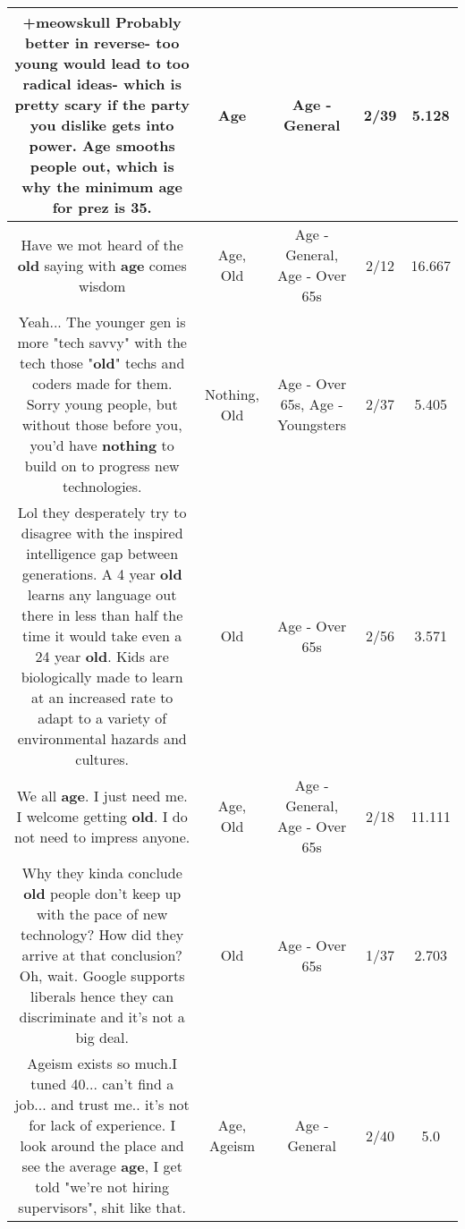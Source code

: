 \documentclass[11pt]{article}
\newlength\mylength
\begin{document}
\begin{center}
\begin{longtable}{|C{.65\mylength}|C{.30\mylength}|C{.12\mylength}|C{.12\mylength}|C{.12\mylength}|}
  \small +meowskull Probably better in reverse- too young would lead to too radical ideas- which is pretty scary if the party you dislike gets into power. \textbf{Age} smooths people out, which is why the minimum \textbf{age} for prez is 35.\normalsize   & Age & Age - General & 2/39 & 5.128 \\  \hline
  \small Have we mot heard of the \textbf{old} saying with \textbf{age} comes wisdom\normalsize   & Age, Old & Age - General, Age - Over 65s & 2/12 & 16.667 \\  \hline
  \small Yeah... The younger gen is more "tech savvy" with the tech those "\textbf{old}" techs and coders made for them. Sorry young people, but without those before you, you'd have \textbf{nothing} to build on to progress new technologies.\normalsize   & Nothing, Old & Age - Over 65s, Age - Youngsters & 2/37 & 5.405 \\  \hline
  \small Lol they desperately try to disagree with the inspired intelligence gap between generations. A 4 year \textbf{old} learns any language out there in less than half the time it would take even a 24 year \textbf{old}. Kids are biologically made to learn at an increased rate to adapt to a variety of environmental hazards and cultures.\normalsize   & Old & Age - Over 65s & 2/56 & 3.571 \\  \hline
  \small We all \textbf{age}. I just need me. I welcome getting \textbf{old}. I do not need to impress anyone.\normalsize   & Age, Old & Age - General, Age - Over 65s & 2/18 & 11.111 \\  \hline
  \small Why they kinda conclude \textbf{old} people don't keep up with the pace of new technology? How did they arrive at that conclusion? Oh, wait. Google supports liberals hence they can discriminate and it's not a big deal.\normalsize   & Old & Age - Over 65s & 1/37 & 2.703 \\  \hline
  \small Ageism exists so much.I tuned 40... can't find a job... and trust me.. it's not for lack of experience. I look around the place and see the average \textbf{age}, I get told "we're not hiring supervisors", shit like that.\normalsize   & Age, Ageism & Age - General & 2/40 & 5.0 \\  \hline

\end{longtable}
\end{center}
\end{document}
